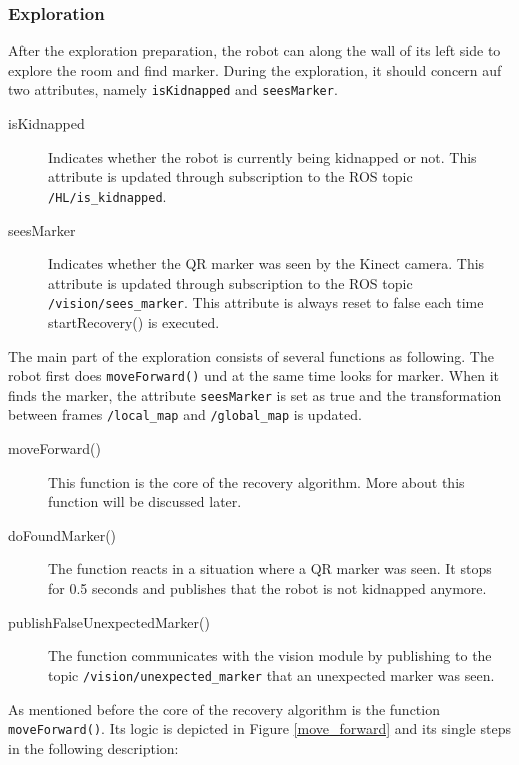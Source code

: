 \subsubsection{Exploration}
After the exploration preparation, the robot can along the wall of its left side to explore the room and find marker. During the exploration, it should concern auf two attributes, namely \texttt{isKidnapped} and \texttt{seesMarker}.
\begin{description}
\item[isKidnapped] Indicates whether the robot is currently being kidnapped or not. This attribute is updated through subscription to the ROS topic \texttt{/HL/is\_kidnapped}.

\item[seesMarker] Indicates whether the QR marker was seen by the Kinect camera. This attribute is updated through subscription to the ROS topic \texttt{/vision/sees\_marker}. This attribute is always reset to false each time startRecovery() is executed.
\end{description}

The main part of the exploration consists of several functions as following. The robot first does \texttt{moveForward()} und at the same time looks for marker. When it finds the marker, the attribute \texttt{seesMarker} is set as true and the transformation between frames \texttt{/local\_map} and \texttt{/global\_map} is updated.
\begin{description}
\item[moveForward()] This function is the core of the recovery algorithm. More about this function will be discussed later.

\item[doFoundMarker()] The function reacts in a situation where a QR marker was seen. It stops for 0.5 seconds and publishes that the robot is not kidnapped anymore.

\item[publishFalseUnexpectedMarker()] The function communicates with the vision module by publishing to the topic \texttt{/vision/unexpected\_marker} that an unexpected marker was seen.
\end{description}


As mentioned before the core of the recovery algorithm is the function \texttt{moveForward()}. Its logic is depicted in Figure \ref{move_forward} and its single steps in the following description:

